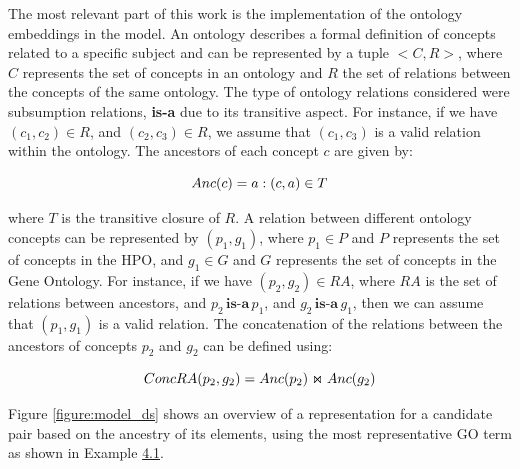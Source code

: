 The most relevant part of this work is the implementation of the ontology embeddings in the model. An ontology describes a formal definition of concepts related to a specific subject and can be represented by a tuple $<C, R>$, where $C$ represents the set of concepts in an ontology and $R$ the set of relations between the concepts of the same ontology. The type of ontology relations considered were subsumption relations, \textbf{is-a} due to its transitive aspect. For instance, if we have $(c_1, c_2) \in R$, and $(c_2, c_3) \in R$, we assume that $(c_1, c_3)$ is a valid relation within the ontology. The ancestors of each concept $c$ are given by:

\begin{equation}
\small
Anc(c) = a : (c, a) \in T
\label{equation:ancestors}
\end{equation}

where $T$ is the transitive closure of $R$. A relation between different ontology concepts can be represented by $(p_1, g_1)$, where $p_1 \in P$ and $P$ represents the set of concepts in the HPO, and $g_1 \in G$ and $G$ represents the set of concepts in the Gene Ontology. For instance, if we have $(p_2, g_2) \in RA$, where $RA$ is the set of relations between ancestors, and $p_2\,\textbf{is-a}\,p_1$, and $g_2\,\textbf{is-a}\,g_1$, then we can assume that $(p_1, g_1)$ is a valid relation. The concatenation of the relations between the ancestors of concepts $p_2$ and $g_2$ can be defined using:

\begin{equation}
\small
ConcRA(p_2, g_2) = Anc(p_2) \Join Anc(g_2)
\label{equation:cancestors}
\end{equation}

Figure \ref{figure:model_ds} shows an overview of a representation for a candidate pair based on the ancestry of its elements, using the most representative GO term as shown in Example \hyperlink{ex4.1}{4.1}. 

